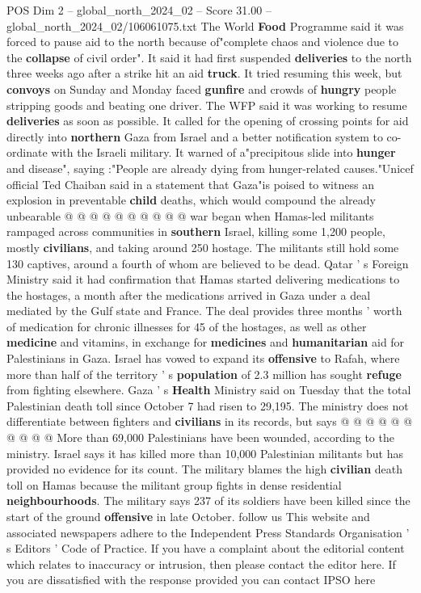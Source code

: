 \begin{textsample}{POS Dim 2 – global\_north\_2024\_02 – Score 31.00 – global\_north\_2024\_02/106061075.txt}
The World \textbf{Food} Programme said it was forced to pause aid to the north because of"complete chaos and violence due to the \textbf{collapse} of civil order".
It said it had first suspended \textbf{deliveries} to the north three weeks ago after a strike hit an aid \textbf{truck}.
It tried resuming this week, but \textbf{convoys} on Sunday and Monday faced \textbf{gunfire} and crowds of \textbf{hungry} people stripping goods and beating one driver.
The WFP said it was working to resume \textbf{deliveries} as soon as possible.
It called for the opening of crossing points for aid directly into \textbf{northern} Gaza from Israel and a better notification system to co-ordinate with the Israeli military.
It warned of a"precipitous slide into \textbf{hunger} and disease", saying :"People are already dying from hunger-related causes."Unicef official Ted Chaiban said in a statement that Gaza"is poised to witness an explosion in preventable \textbf{child} deaths, which would compound the already unbearable @ @ @ @ @ @ @ @ @ @ war began when Hamas-led militants rampaged across communities in \textbf{southern} Israel, killing some 1,200 people, mostly \textbf{civilians}, and taking around 250 hostage.
The militants still hold some 130 captives, around a fourth of whom are believed to be dead.
Qatar ' s Foreign Ministry said it had confirmation that Hamas started delivering medications to the hostages, a month after the medications arrived in Gaza under a deal mediated by the Gulf state and France.
The deal provides three months ' worth of medication for chronic illnesses for 45 of the hostages, as well as other \textbf{medicine} and vitamins, in exchange for \textbf{medicines} and \textbf{humanitarian} aid for Palestinians in Gaza.
Israel has vowed to expand its \textbf{offensive} to Rafah, where more than half of the territory ' s \textbf{population} of 2.3 million has sought \textbf{refuge} from fighting elsewhere.
Gaza ' s \textbf{Health} Ministry said on Tuesday that the total Palestinian death toll since October 7 had risen to 29,195.
The ministry does not differentiate between fighters and \textbf{civilians} in its records, but says @ @ @ @ @ @ @ @ @ @ More than 69,000 Palestinians have been wounded, according to the ministry.
Israel says it has killed more than 10,000 Palestinian militants but has provided no evidence for its count.
The military blames the high \textbf{civilian} death toll on Hamas because the militant group fights in dense residential \textbf{neighbourhoods}.
The military says 237 of its soldiers have been killed since the start of the ground \textbf{offensive} in late October. follow us This website and associated newspapers adhere to the Independent Press Standards Organisation ' s Editors ' Code of Practice.
If you have a complaint about the editorial content which relates to inaccuracy or intrusion, then please contact the editor here.
If you are dissatisfied with the response provided you can contact IPSO here


\end{textsample}
